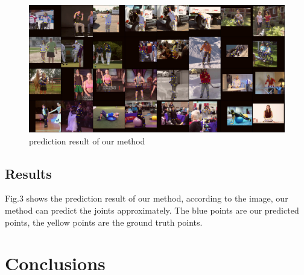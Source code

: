 \documentclass[final]{cvpr}
\begin{document}
\begin{figure}[h]
\centering
\includegraphics[width=\textwidth]{pred.jpg}
\caption{prediction result of our method}
\end{figure}
\subsection{Results}
Fig.3 shows the prediction result of our method, according to the image, our method can predict the joints approximately. The blue points are our predicted points, the yellow points are the ground truth points.



\section{Conclusions}
\end{document}
